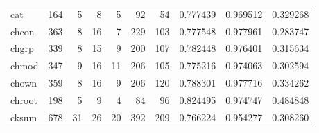 \begin{tabular}{lrrrrrrrrr}
cat       &                    164 &                                  5 &                                 8 &                                5 &                                92 &                              54 &                                0.777439 &                               0.969512 &                             0.329268 \\
chcon     &                    363 &                                  8 &                                16 &                                7 &                               229 &                             103 &                                0.777548 &                               0.977961 &                             0.283747 \\
chgrp     &                    339 &                                  8 &                                15 &                                9 &                               200 &                             107 &                                0.782448 &                               0.976401 &                             0.315634 \\
chmod     &                    347 &                                  9 &                                16 &                               11 &                               206 &                             105 &                                0.775216 &                               0.974063 &                             0.302594 \\
chown     &                    359 &                                  8 &                                16 &                                9 &                               206 &                             120 &                                0.788301 &                               0.977716 &                             0.334262 \\
chroot    &                    198 &                                  5 &                                 9 &                                4 &                                84 &                              96 &                                0.824495 &                               0.974747 &                             0.484848 \\
cksum     &                    678 &                                 31 &                                26 &                               20 &                               392 &                             209 &                                0.766224 &                               0.954277 &                             0.308260 \\

\end{tabular}

